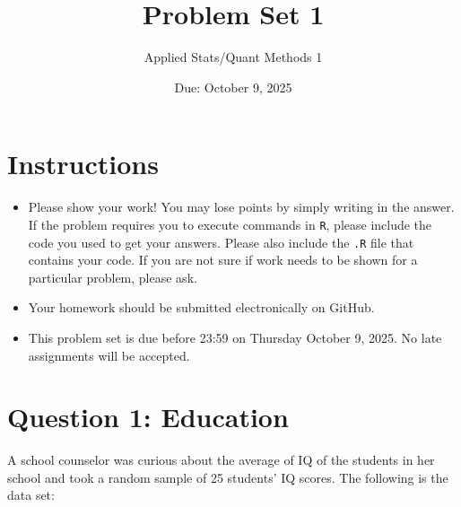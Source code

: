\documentclass[12pt,letterpaper]{article}
\title{Problem Set 1}
\date{Due: October 9, 2025}
\author{Applied Stats/Quant Methods 1}
\begin{document}
	\maketitle
	
	\section*{Instructions}
	\begin{itemize}
		\item Please show your work! You may lose points by simply writing in the answer. If the problem requires you to execute commands in \texttt{R}, please include the code you used to get your answers. Please also include the \texttt{.R} file that contains your code. If you are not sure if work needs to be shown for a particular problem, please ask.
		\item Your homework should be submitted electronically on GitHub.
		\item This problem set is due before 23:59 on Thursday October 9, 2025. No late assignments will be accepted.
	\end{itemize}
	
	\vspace{1cm}
	\section*{Question 1: Education}
	
	A school counselor was curious about the average of IQ of the students in her school and took a random sample of 25 students' IQ scores. The following is the data set:\\
	\vspace{.5cm}
	
	  
	
	\vspace{1cm}
	
\end{document}
